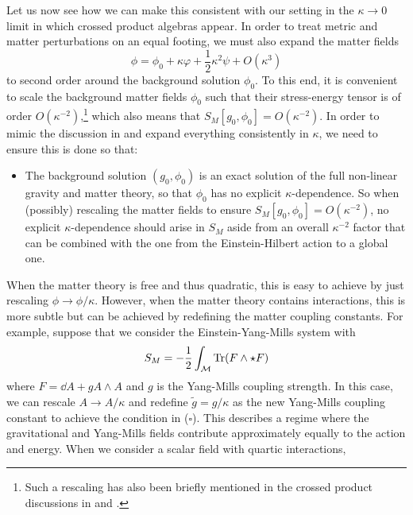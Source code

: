 \documentclass[]{jkpaper}
\theoremstyle{plain}
\theoremstyle{definition}
\begin{document}
Let us now see how we can make this consistent with our setting in the $\kappa\to0$ limit in which crossed product algebras appear. In order to treat metric and matter perturbations on an equal footing, we must also expand the matter fields
\begin{equation}\label{matterpert}
    \phi = \phi_0+\kappa\varphi+\frac{1}{2}\kappa^2\psi+O(\kappa^3)
\end{equation}
to second order around the background solution $\phi_0$. To this end, it is convenient to scale the background matter fields $\phi_0$ such that their stress-energy tensor is of order $O(\kappa^{-2})$,\footnote{Such a rescaling has also been briefly mentioned
in the crossed product discussions in \cite[Sec.~4]{Chen:2024rpx} and \cite[footnote 7]{Jensen:2023yxy}.} which also means that $S_M[g_0,\phi_0]=O(\kappa^{-2})$. In order to mimic the discussion in \cite{Arms1,Arms:1979au,Arms:1982ea,Saraykar:1981qm,Saraykar2,Arms:1986vk,Altas:2021htf} and expand everything consistently in $\kappa$, we need to ensure this is done so that:
\begin{itemize}
    \item[({\color{red}$\square$})] The background solution $(g_0,\phi_0)$ is an exact solution of the full non-linear gravity and matter theory, so that $\phi_0$ has no explicit $\kappa$-dependence. So when (possibly) rescaling the matter fields to ensure $S_M[g_0,\phi_0]=O(\kappa^{-2})$, no explicit $\kappa$-dependence should arise in $S_M$ aside from an overall $\kappa^{-2}$ factor that can be combined with the one from the Einstein-Hilbert action to a global one. 
\end{itemize}
When the matter theory is free and thus quadratic, this is easy to achieve by just rescaling $\phi\to\phi/\kappa$. However, when the matter theory contains interactions, this is more subtle but can be achieved by redefining the matter coupling constants. For example, suppose that we consider the Einstein-Yang-Mills system with \begin{equation} {S_M=-\frac{1}{2}\int_\mathcal{M}\Tr(F\wedge\star F)}
\end{equation}
where ${F=\dd A+g A\wedge A}$ and $g$ is the Yang-Mills coupling strength. In this case, we can rescale $A\to A/\kappa$ and redefine $\tilde{g}=g/\kappa$ as the new Yang-Mills coupling constant to achieve the condition in ({\color{red}$\square$}). This describes a regime where the gravitational and Yang-Mills fields contribute approximately equally to the action and energy. When we consider a scalar field with quartic interactions, 
\end{document}
